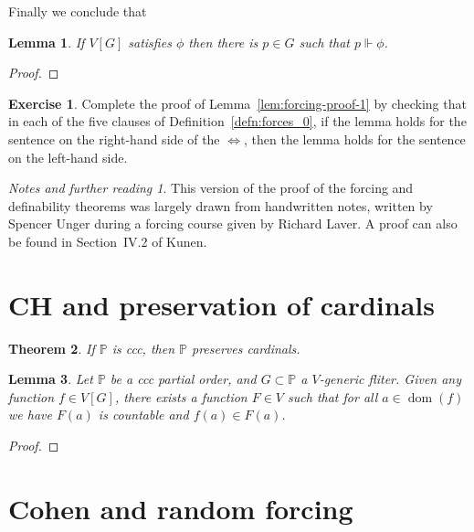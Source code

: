 \documentclass[11pt,oneside]{amsbook}
\newcommand{\forces}{\Vdash}
\newcommand{\PP}{\mathbb P}
\DeclareMathOperator{\dom}{dom}
\theoremstyle{definition}
\newtheorem{exerc}{Exercise}[section]
\theoremstyle{plain}
\newtheorem{thm}{Theorem}[section]
\newtheorem{lem}[thm]{Lemma}
\theoremstyle{definition}
\theoremstyle{remark}
\newtheorem*{notes}{Notes and further reading}
\begin{document}
Finally we conclude that 

\begin{lem}
  If $V[G]$ satisfies $\phi$ then there is $p\in G$ such that $p\forces\phi$.
\end{lem}

\begin{proof}
  
\end{proof}

\begin{exerc}
  \label{exerc:forcing-proof-1}
  Complete the proof of Lemma~\ref{lem:forcing-proof-1} by checking that in each of the five clauses of Definition~\ref{defn:forces_0}, if the lemma holds for the sentence on the right-hand side of the $\iff$, then the lemma holds for the sentence on the left-hand side.
\end{exerc}

\begin{notes}
  This version of the proof of the forcing and definability theorems was largely drawn from handwritten notes, written by Spencer Unger during a forcing course given by Richard Laver. A proof can also be found in Section~IV.2 of Kunen.
\end{notes}


\section{CH and preservation of cardinals}

\begin{thm}
  If $\PP$ is ccc, then $\PP$ preserves cardinals.
\end{thm}

\begin{lem}
  Let $\PP$ be a ccc partial order, and $G\subset\PP$ a $V$-generic fliter. Given any function $f\in V[G]$, there exists a function $F\in V$ such that for all $a\in\dom(f)$ we have $F(a)$ is countable and $f(a)\in F(a)$.
\end{lem}

\begin{proof}
  
\end{proof}



\section{Cohen and random forcing}
\end{document}
